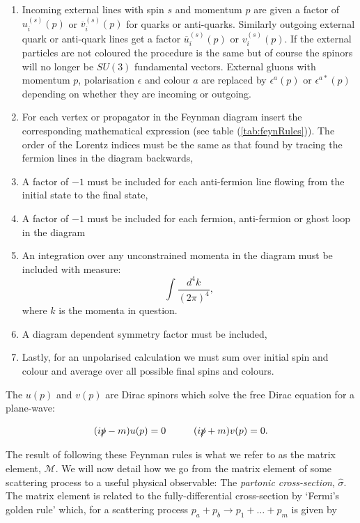 	\begin{enumerate}
		\item Incoming external lines with spin $s$ and momentum $p$ are given a factor of $u^{(s)}_i(p)$ or $\overline{v}^{(s)}_i(p)$
		      for quarks or anti-quarks.  Similarly outgoing external quark or anti-quark lines get a factor
		      $\overline{u}^{(s)}_i(p)$ or $v^{(s)}_i(p)$.  If the external particles are not coloured the procedure is the same
		      but of course the spinors will no longer be $SU(3)$ fundamental vectors.  External gluons with momentum $p$, polarisation
		      $\epsilon$ and colour $a$ are replaced by $\epsilon^a(p)$ or $\epsilon^{a*}(p)$ depending on whether they are incoming or outgoing.
		\item For each vertex or propagator in the Feynman diagram insert the corresponding mathematical
		      expression (see table (\ref{tab:feynRules})).  The order of the Lorentz indices must be the same
		      as that found by tracing the fermion lines in the diagram backwards,
		\item A factor of $-1$ must be included for each anti-fermion line flowing from the initial state
		      to the final state,
		\item A factor of $-1$ must be included for each fermion, anti-fermion or ghost loop in the diagram
		\item An integration over any unconstrained momenta in the diagram must be included with measure:
		      \begin{equation}
		      	\int\frac{d^4k}{(2\pi)^4},
		      \end{equation}
		      where $k$ is the momenta in question.
		\item A diagram dependent symmetry factor must be included,
		\item Lastly, for an unpolarised calculation we must sum over initial spin and colour and average
		      over all possible final spins and colours.
	\end{enumerate}

	The $u(p)$ and $v(p)$ are Dirac spinors which solve the free Dirac equation for a plane-wave:

	\begin{equation}
		(i\slashed p - m)u(p)=0\hspace{1cm}(i\slashed p + m)v(p)=0.
		\label{eqn:diracPW}
	\end{equation}

	The result of following these Feynman rules is what we refer to as the matrix element, $\mathcal{M}$.  We will now detail how
	we go from the matrix element of some scattering process to a useful physical observable: The \emph{partonic cross-section},
	$\hat{\sigma}$.  The matrix element is related to the fully-differential cross-section by `Fermi's golden rule' which, for
	a scattering process $p_{a} + p_{b}\rightarrow p_{1} + \ldots + p_{m}$ is given by

